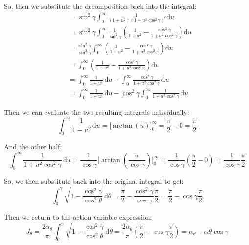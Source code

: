 \documentclass[titlepage]{article}
\begin{document}
So, then we substitute the decomposition back into the integral:
\begin{equation}
	\begin{split}
		&=\sin^2\gamma\int_{0}^{\infty}\frac{1}{(1+u^2)(1+u^2\cos^2\gamma)}\,\mathrm{d}u \\
		&=\sin^2\gamma\int_{0}^{\infty}\frac{1}{\sin^2\gamma}\left(\frac{1}{1+u^2}-\frac{\cos^2\gamma}{1+u^2\cos^2\gamma}\right)\mathrm{d}u \\
		&=\frac{\sin^2\gamma}{\sin^2\gamma}\int_{0}^{\infty}\left(\frac{1}{1+u^2}-\frac{\cos^2\gamma}{1+u^2\cos^2\gamma}\right)\mathrm{d}u \\
		&=\int_{0}^{\infty}\left(\frac{1}{1+u^2}-\frac{\cos^2\gamma}{1+u^2\cos^2\gamma}\right)\mathrm{d}u \\
		&=\int_{0}^{\infty}\frac{1}{1+u^2}\,\mathrm{d}u-\int_{0}^{\infty}\frac{\cos^2\gamma}{1+u^2\cos^2\gamma}\,\mathrm{d}u \\
		&=\int_{0}^{\infty}\frac{1}{1+u^2}\,\mathrm{d}u-\cos^2\gamma\int_{0}^{\infty}\frac{1}{1+u^2\cos^2\gamma}\,\mathrm{d}u
	\end{split}
\end{equation}

Then we can evaluate the two resulting integrals individually:
\begin{equation}
	\int_{0}^{\infty}\frac{1}{1+u^2}\,\mathrm{d}u=\Big[\arctan(u)\Big]_{0}^{\infty}=\frac{\pi}{2}-0=\frac{\pi}{2}
\end{equation}

And the other half:
\begin{equation}
	\int_{0}^{\infty}\frac{1}{1+u^2\cos^2\gamma}\,\mathrm{d}u=\frac{1}{\cos\gamma}\Big[\arctan\left(\frac{u}{\cos\gamma}\right)\Big]_{0}^{\infty}=\frac{1}{\cos\gamma}\left(\frac{\pi}{2}-0\right)=\frac{1}{\cos\gamma}\frac{\pi}{2}
\end{equation}

So, we then substitute back into the original integral to get:
\begin{equation}
	\int_{0}^{\gamma}\sqrt{1-\frac{\cos^2\gamma}{\cos^2\theta}}\,\mathrm{d}\theta=\frac{\pi}{2}-\frac{\cos^2\gamma}{\cos\gamma}\frac{\pi}{2}=\frac{\pi}{2}-\cos\gamma\frac{\pi}{2}
\end{equation}

Then we return to the action variable expression:
\begin{equation}
	J_\theta=\frac{2\alpha_\theta}{\pi}\int_{0}^{\gamma}\sqrt{1-\frac{\cos^2\gamma}{\cos^2\theta}}\,\mathrm{d}\theta=\frac{2\alpha_\theta}{\pi}\left(\frac{\pi}{2}-\cos\gamma\frac{\pi}{2}\right)=\alpha_\theta-\alpha\theta\cos\gamma
\end{equation}
\end{document}
